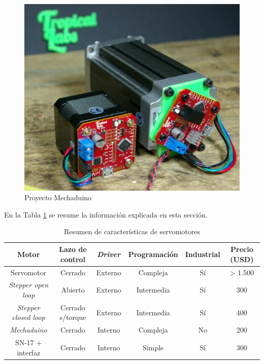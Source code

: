 \begin{figure}[htbp]
	\centering
	\includegraphics[scale=.6]{./Figures/mechaduino.jpg}
	\caption{Proyecto Mechaduino\protect\footnotemark}
	\label{fig:mechaduino}
\end{figure}


En la Tabla \ref{tab:servos} se resume la información explicada en esta sección.


\begin{table}[h]
	\centering
	\caption[Estado del arte]{Resumen de características de servomotores}
	\begin{tabular}{c c c c c c}    
		\toprule
		\textbf{Motor} 	 & \textbf{Lazo de control}  & \textbf{\textit{Driver}} & \textbf{Programación} & \textbf{Industrial} & \textbf{Precio (USD)} \\
		\midrule
		Servomotor & Cerrado & Externo & Compleja & Sí	& >  1.500 \\		
		\textit{Stepper open loop} & Abierto & Externo & Intermedia & Sí	&  300\\
		\textit{Stepper closed loop} & Cerrado s/torque	& Externo & Intermedia & Sí	&  400\\
		\textit{Mechaduino} & Cerrado	& Interno & Compleja & No	&  200 \\
		SN-17 + interfaz	& Cerrado	& Interno & Simple & Sí		&  300 \\
		\bottomrule
		\hline
	\end{tabular}
	\label{tab:servos}
\end{table}

